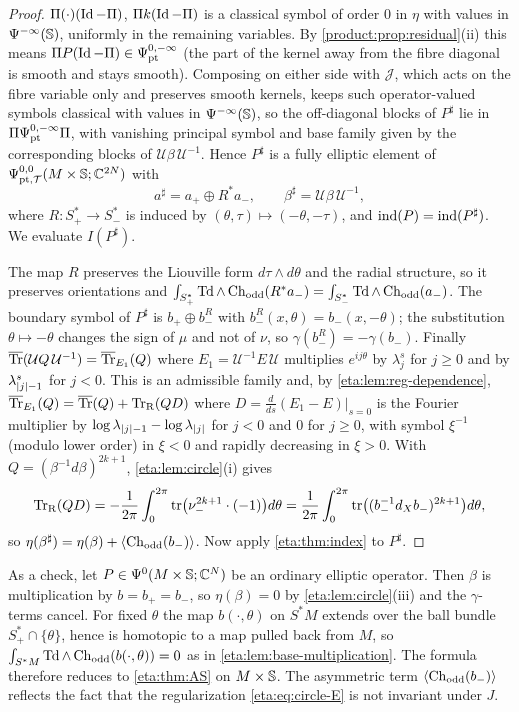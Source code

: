 \begin{proof}
$\Pi(\cdot)(\operatorname{Id}-\Pi)$, $\Pi k(\operatorname{Id}-\Pi)$ is a classical symbol of order $0$ in $\eta$
with values in $\Psi^{-\infty}(\mathbb{S})$, uniformly in the remaining variables. By
\cref{product:prop:residual}(ii) this means $\Pi P(\operatorname{Id}-\Pi)\in\Psi^{0,-\infty}_{\mathrm{pt}}$
(the part of the kernel away from the fibre diagonal is smooth and stays smooth).
Composing on either side with $\mathcal J$, which acts on the fibre variable only and
preserves smooth kernels, keeps such operator-valued symbols classical with values in
$\Psi^{-\infty}(\mathbb{S})$, so the off-diagonal blocks of $P^\sharp$ lie in
$\Pi\Psi^{0,-\infty}_{\mathrm{pt}}\Pi$, with vanishing principal symbol and base family given by
the corresponding blocks of $\mathcal U\beta\,\mathcal U^{-1}$. Hence $P^\sharp$
is a fully elliptic element of $\Psi^{0,0}_{\mathrm{pt},\mathcal{T}}(M\times\mathbb{S};\mathbb{C}^{2N})$ with
\[
a^\sharp=a_+\oplus R^*a_-,\qquad\beta^\sharp=\mathcal U\beta\,\mathcal U^{-1},
\]
where $R:S^*_+\longrightarrow S^*_-$ is induced by $(\theta,\tau)\mapsto(-\theta,-\tau)$, and
$\operatorname{ind}(P)=\operatorname{ind}(P^\sharp)$. We evaluate $I(P^\sharp)$.

The map $R$ preserves the Liouville form $d\tau\wedge d\theta$ and the radial structure, so
it preserves orientations and $\int_{S^*_+}\operatorname{Td}\wedge\operatorname{Ch}_{\mathrm{odd}}(R^*a_-)=\int_{S^*_-}\operatorname{Td}\wedge\operatorname{Ch}_{\mathrm{odd}}(a_-)$.
The boundary symbol of $P^\sharp$ is $b_+\oplus b_-^R$ with
$b_-^R(x,\theta)=b_-(x,-\theta)$; the substitution $\theta\mapsto-\theta$ changes the sign of
$\mu$ and not of $\nu$, so $\gamma(b_-^R)=-\gamma(b_-)$. Finally
$\overline{\operatorname{Tr}}(\mathcal UQ\,\mathcal U^{-1})=\overline{\operatorname{Tr}}_{E_1}(Q)$ where $E_1=\mathcal U^{-1}E\,\mathcal U$
multiplies $e^{ij\theta}$ by $\lambda_j^s$ for $j\ge0$ and by $\lambda_{\lvert j\rvert-1}^s$ for $j<0$.
This is an admissible family and, by \cref{eta:lem:reg-dependence},
$\overline{\operatorname{Tr}}_{E_1}(Q)=\overline{\operatorname{Tr}}(Q)+\operatorname{Tr}_{\mathrm{R}}(QD)$ where $D=\frac{d}{ds}(E_1-E)|_{s=0}$ is the Fourier
multiplier by $\log\lambda_{\lvert j\rvert-1}-\log\lambda_{\lvert j\rvert}$ for $j<0$ and $0$ for
$j\ge0$, with symbol $\xi^{-1}$ (modulo lower order) in $\xi<0$ and rapidly
decreasing in $\xi>0$. With $Q=(\beta^{-1}d\beta)^{2k+1}$, \cref{eta:lem:circle}(i) gives
\[
\operatorname{Tr}_{\mathrm{R}}(QD)=-\frac1{2\pi}\int_0^{2\pi}\operatorname{tr}\bigl(\nu_-^{2k+1}\cdot(-1)\bigr)d\theta
=\frac1{2\pi}\int_0^{2\pi}\operatorname{tr}\bigl((b_-^{-1}d_Xb_-)^{2k+1}\bigr)d\theta,
\]
so $\eta(\beta^\sharp)=\eta(\beta)+\langle\operatorname{Ch}_{\mathrm{odd}}(b_-)\rangle$. Now apply
\cref{eta:thm:index} to $P^\sharp$.
\end{proof}

As a check, let $P\in\Psi^{0}(M\times\mathbb{S};\mathbb{C}^N)$ be an ordinary elliptic operator.
Then $\beta$ is multiplication by $b=b_+=b_-$, so $\eta(\beta)=0$ by
\cref{eta:lem:circle}(iii) and the $\gamma$-terms cancel. For fixed $\theta$ the map
$b(\cdot,\theta)$ on $S^*M$ extends over the ball bundle $S^*_+\cap\{\theta\}$, hence is
homotopic to a map pulled back from $M$, so $\int_{S^*M}\operatorname{Td}\wedge\operatorname{Ch}_{\mathrm{odd}}(b(\cdot,\theta))=0$
as in \cref{eta:lem:base-multiplication}. The formula therefore reduces to
\cref{eta:thm:AS} on $M\times\mathbb{S}$. The asymmetric term $\langle\operatorname{Ch}_{\mathrm{odd}}(b_-)\rangle$
reflects the fact that the regularization \eqref{eta:eq:circle-E} is not invariant under
$J$.

